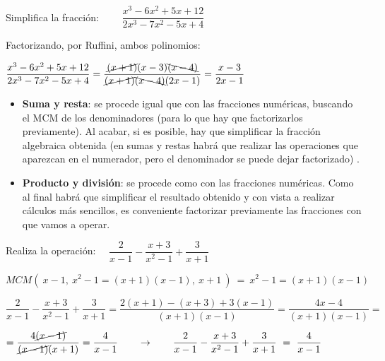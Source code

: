 \begin{miejemplo}

Simplifica la fracción: $\qquad \dfrac{x^3-6x^2+5x+12}{2x^3-7x^2-5x+4}$

\vspace{4mm} Factorizando, por Ruffini, ambos polinomios:

\vspace{2mm} $\dfrac{x^3-6x^2+5x+12}{2x^3-7x^2-5x+4}=
\dfrac { \cancel{(x+1)} (x-3) \bcancel{(x-4)}} { \cancel{(x+1)} \bcancel{(x-4)} (2x-1) }= \dfrac{x-3}{2x-1}$
	
\end{miejemplo}


\begin{theorem}

\begin{itemize}
\item \textbf{Suma y resta}: se procede igual que con las fracciones numéricas, buscando el MCM de los denominadores (para lo que hay que factorizarlos previamente). Al acabar, si es posible, hay que simplificar la fracción algebraica obtenida (en sumas y restas habrá que realizar las operaciones que aparezcan en el numerador, pero el denominador se puede dejar factorizado) .
\item \textbf{Producto y división}: se procede como con las fracciones numéricas. Como al final habrá que simplificar el resultado obtenido y con vista a realizar cálculos más sencillos, es conveniente factorizar previamente las fracciones con que vamos a operar.
\end{itemize}
	
\end{theorem}

\begin{miejemplo}

Realiza la operación: $\quad \dfrac{2}{x-1}-\dfrac{x+3}{x^2-1}+\dfrac{3}{x+1}$
	
\vspace{2mm} $MCM\left( \ x-1, \ x^2-1=(x+1)(x-1),\ x+1 \ \right) \ = \ x^2-1=(x+1)(x-1)$

\vspace{2mm} $\dfrac{2}{x-1}-\dfrac{x+3}{x^2-1}+\dfrac{3}{x+1}= \dfrac
{2(x+1)-(x+3)+3(x-1)}
{(x+1)(x-1)}=
\dfrac{4x-4}{(x+1)(x-1)}= $ 

\vspace{2mm} $=\dfrac {4 \cancel{ (x-1) } }  { \cancel{(x-1)} (x+1) }= \dfrac{4}{x-1} \qquad \to \qquad \dfrac{2}{x-1}-\dfrac{x+3}{x^2-1}+\dfrac{3}{x+1} \ = \  \dfrac{4}{x-1}$
\end{miejemplo}

